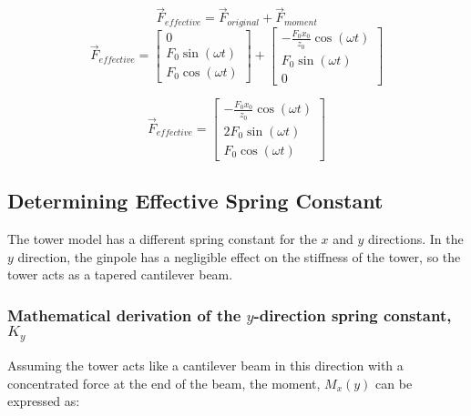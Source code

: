 \begin{equation}\label{eq:effective_force}
	\vec{F}_{effective} = \vec{F}_{original} + \vec{F}_{moment}
\end{equation}
$$ 
	\vec{F}_{effective} = 
	\begin{bmatrix}0\\F_{0} \sin{\left (\omega t \right )}\\F_{0} \cos{\left (\omega t \right )}\end{bmatrix}
	+ \begin{bmatrix}- \frac{F_{0} x_{0}}{z_{0}} \cos{\left (\omega t \right )}\\ F_{0} \sin{\left (\omega t \right )}\\ 0\end{bmatrix}
$$

\begin{equation}
	\vec{F}_{effective} = 
		\left[\begin{matrix}- \frac{F_{0} x_{0}}{z_{0}} \cos{\left (\omega t \right )}\\2 F_{0} \sin{\left (\omega t \right )}\\F_{0} \cos{\left (\omega t \right )}\end{matrix}\right]
\end{equation}

\subsection{Determining Effective Spring Constant}
The tower model has a different spring constant for the $x$ and $y$ directions.  In the $y$ direction, the ginpole has a negligible effect on the stiffness of the tower, so the tower acts as a tapered cantilever beam. 


\subsubsection{Mathematical derivation of the $y$-direction spring constant, $K_y$}
Assuming the tower acts like a cantilever beam in this direction with a concentrated force at the end of the beam, the moment, $M_x(y)$ can be expressed as:

